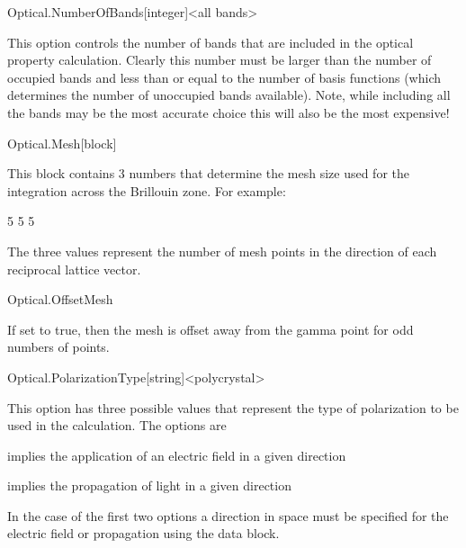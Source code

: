   \begin{fdfentry}{Optical.NumberOfBands}[integer]<all bands>
  
    This option controls the number of bands that are included in the
    optical property calculation. Clearly this number must be larger
    than the number of occupied bands and less than or equal to the
    number of basis functions (which determines the number of unoccupied
    bands available). Note, while including all the bands may be the
    most accurate choice this will also be the most expensive!
  
  \end{fdfentry}
  
  \begin{fdfentry}{Optical.Mesh}[block]
  
    This block contains 3 numbers that determine the mesh size used for
    the integration across the Brillouin zone. For example:
    \begin{fdfexample}
          5 5 5
    \end{fdfexample}
    The three values represent the number of mesh points in the
    direction of each reciprocal lattice vector.
  
  \end{fdfentry}
  
  
  \begin{fdflogicalF}{Optical.OffsetMesh}
  
    If set to true, then the mesh is offset away from the gamma point
    for odd numbers of points.
  
  \end{fdflogicalF}
  
  \begin{fdfentry}{Optical.PolarizationType}[string]<polycrystal>
  
    This option has three possible values that represent the type of
    polarization to be used in the calculation. The options are
    \begin{fdfoptions}
      \option[polarized]%
      implies the application of an electric field in a given direction
  
      \option[unpolarized]%
      implies the propagation of light in a given direction
  
      \option[polycrystal]%
      In the case of the first two options a direction in space must be
      specified for the electric field or propagation using the
       data block.
  
    \end{fdfoptions}
  
  \end{fdfentry}
  
